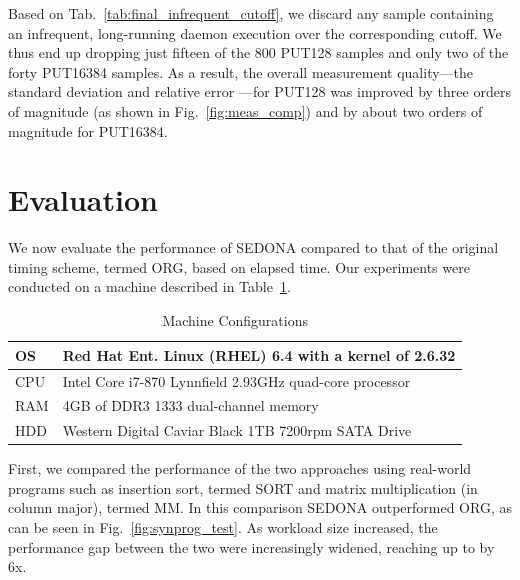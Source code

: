 \documentclass[letter]{ieice}
\begin{document}
Based on Tab.~\ref{tab:final_infrequent_cutoff}, 
we discard any \hbox{sample} \hbox{containing} an infrequent, long-running daemon execution
over the corresponding cutoff. We thus end up dropping just fifteen of the 800
PUT128 samples and only two of the forty PUT16384 samples. 
As a result, the \hbox{overall} \hbox{measurement} quality---the standard deviation and \hbox{relative} error 
---for PUT128 was improved 
by three orders of magnitude (as shown in Fig.~\ref{fig:meas_comp}) 
and by about two \hbox{orders} of magnitude for PUT16384.

\section{Evaluation}
\label{sec:eval}
\vspace{-0.07in}
We now evaluate the \hbox{performance} of SEDONA 
compared to that of the original timing scheme, termed ORG, based on 
elapsed time.
Our experiments were conducted on a \hbox{machine}
described in Table~\ref{tab:machine_config}. 
\begin{table}[h]
\vspace{-0.2in}
\begin{center}
{\tiny
\begin{tabular}{|l|p{7cm}|}\hline
OS & Red Hat Ent. Linux (RHEL) 6.4 with a kernel of 2.6.32 \\ \hline
CPU & Intel Core i7-870 Lynnfield 2.93GHz quad-core \hbox{processor}\\ \hline
RAM & 4GB of DDR3 1333 dual-channel memory\\ \hline
HDD & Western Digital Caviar Black 1TB 7200rpm SATA Drive\\ \hline
\end{tabular}
}
\end{center}
\caption{Machine Configurations\label{tab:machine_config}}
\vspace{-0.35in}
\end{table}

First, we compared the performance of the two approaches 
using real-world programs such as insertion sort, termed SORT and 
matrix multiplication (in column major), termed MM. 
In this comparison SEDONA outperformed ORG, as can be seen in Fig.~\ref{fig:synprog_test}. 
As workload size increased, the performance gap between the two 
were increasingly widened, reaching up to by 6x.
\end{document}
